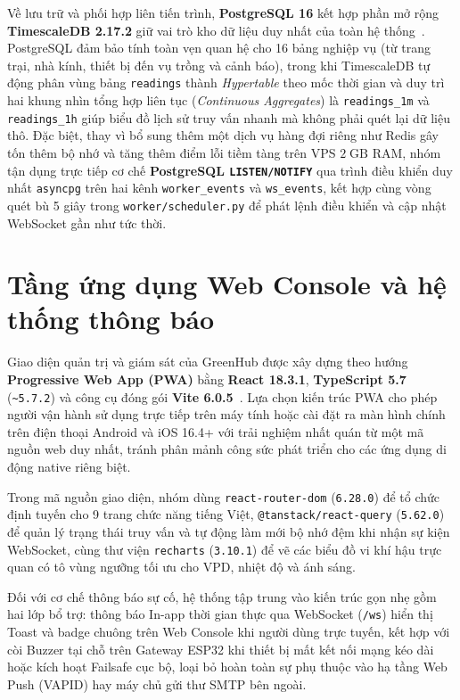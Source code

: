 Về lưu trữ và phối hợp liên tiến trình, \textbf{PostgreSQL 16} kết hợp phần mở rộng \textbf{TimescaleDB 2.17.2} giữ vai trò kho dữ liệu duy nhất của toàn hệ thống~\cite{postgresDocs,timescaledbDocs}. PostgreSQL đảm bảo tính toàn vẹn quan hệ cho 16 bảng nghiệp vụ (từ trang trại, nhà kính, thiết bị đến vụ trồng và cảnh báo), trong khi TimescaleDB tự động phân vùng bảng \texttt{readings} thành \textit{Hypertable} theo mốc thời gian và duy trì hai khung nhìn tổng hợp liên tục (\textit{Continuous Aggregates}) là \texttt{readings\_1m} và \texttt{readings\_1h} giúp biểu đồ lịch sử truy vấn nhanh mà không phải quét lại dữ liệu thô. Đặc biệt, thay vì bổ sung thêm một dịch vụ hàng đợi riêng như Redis gây tốn thêm bộ nhớ và tăng thêm điểm lỗi tiềm tàng trên VPS \(2\;\text{GB}\) RAM, nhóm tận dụng trực tiếp cơ chế \textbf{PostgreSQL \texttt{LISTEN/NOTIFY}} qua trình điều khiển duy nhất \texttt{asyncpg} trên hai kênh \texttt{worker\_events} và \texttt{ws\_events}, kết hợp cùng vòng quét bù 5 giây trong \texttt{worker/scheduler.py} để phát lệnh điều khiển và cập nhật WebSocket gần như tức thời.

\section{Tầng ứng dụng Web Console và hệ thống thông báo}
\label{sec:c2-web}

Giao diện quản trị và giám sát của GreenHub được xây dựng theo hướng \textbf{Progressive Web App (PWA)} bằng \textbf{React 18.3.1}, \textbf{TypeScript 5.7} (\texttt{\textasciitilde 5.7.2}) và công cụ đóng gói \textbf{Vite 6.0.5}~\cite{reactDocs,viteDocs}. Lựa chọn kiến trúc PWA cho phép người vận hành sử dụng trực tiếp trên máy tính hoặc cài đặt ra màn hình chính trên điện thoại Android và iOS 16.4+ với trải nghiệm nhất quán từ một mã nguồn web duy nhất, tránh phân mảnh công sức phát triển cho các ứng dụng di động native riêng biệt.

Trong mã nguồn giao diện, nhóm dùng \texttt{react-router-dom} (\texttt{6.28.0}) để tổ chức định tuyến cho 9 trang chức năng tiếng Việt, \texttt{@tanstack/react-query} (\texttt{5.62.0}) để quản lý trạng thái truy vấn và tự động làm mới bộ nhớ đệm khi nhận sự kiện WebSocket, cùng thư viện \texttt{recharts} (\texttt{3.10.1}) để vẽ các biểu đồ vi khí hậu trực quan có tô vùng ngưỡng tối ưu cho VPD, nhiệt độ và ánh sáng.

Đối với cơ chế thông báo sự cố, hệ thống tập trung vào kiến trúc gọn nhẹ gồm hai lớp bổ trợ: thông báo In-app thời gian thực qua WebSocket (\texttt{/ws}) hiển thị Toast và badge chuông trên Web Console khi người dùng trực tuyến, kết hợp với còi Buzzer tại chỗ trên Gateway ESP32 khi thiết bị mất kết nối mạng kéo dài hoặc kích hoạt Failsafe cục bộ, loại bỏ hoàn toàn sự phụ thuộc vào hạ tầng Web Push (VAPID) hay máy chủ gửi thư SMTP bên ngoài.

